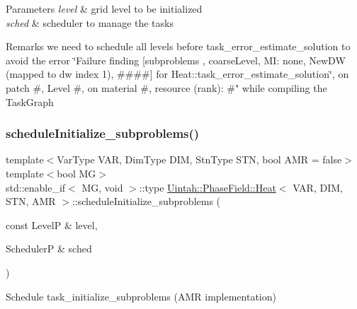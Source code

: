 \begin{DoxyParams}{Parameters}
{\em level} & grid level to be initialized \\
\hline
{\em sched} & scheduler to manage the tasks\\
\hline
\end{DoxyParams}
\begin{DoxyRemark}{Remarks}
we need to schedule all levels before task\+\_\+error\+\_\+estimate\+\_\+solution to avoid the error \char`\"{}\+Failure finding \mbox{[}subproblems , coarse\+Level, M\+I\+: none, New\+D\+W
(mapped to dw index 1), \#\#\#\#\mbox{]} for Heat\+::task\+\_\+error\+\_\+estimate\+\_\+solution\char`\"{}, on patch \#, Level \#, on material \#, resource (rank)\+: \#" while compiling the Task\+Graph 
\end{DoxyRemark}
\mbox{\label{classUintah_1_1PhaseField_1_1Heat_a0e727154c6a78ee48cec37740cfe2889}} 
\subsubsection{\texorpdfstring{schedule\+Initialize\+\_\+subproblems()}{scheduleInitialize\_subproblems()}\hspace{0.1cm}{\footnotesize\ttfamily [2/2]}}
{\footnotesize\ttfamily template$<$Var\+Type V\+AR, Dim\+Type D\+IM, Stn\+Type S\+TN, bool A\+MR = false$>$ \\
template$<$bool MG$>$ \\
std\+::enable\+\_\+if$<$ MG, void $>$\+::type \hyperlink{classUintah_1_1PhaseField_1_1Heat}{Uintah\+::\+Phase\+Field\+::\+Heat}$<$ V\+AR, D\+IM, S\+TN, A\+MR $>$\+::schedule\+Initialize\+\_\+subproblems (\begin{DoxyParamCaption}\item[{const LevelP \&}]{level,  }\item[{SchedulerP \&}]{sched }\end{DoxyParamCaption})\hspace{0.3cm}{\ttfamily [protected]}}



Schedule task\+\_\+initialize\+\_\+subproblems (A\+MR implementation) 

